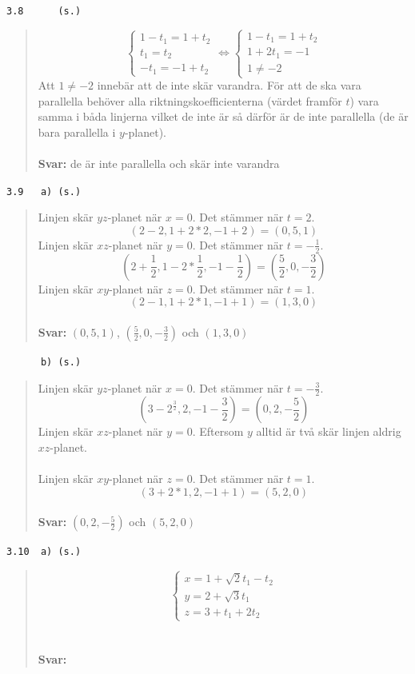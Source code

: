 \documentclass[a4paper]{article}
\newcommand{\tskcol}[1]{\textcolor{tskcol}{#1}}
\begin{document}
\texttt{\tskcol{3.8~~~~~ (s.)}}
\begin{quotation}
	\noindent
	\[\begin{cases}
	1-t_1=1+t_2 \\
	t_1=t_2 \\
	-t_1=-1+t_2
	\end{cases} \Leftrightarrow
	\begin{cases}
	1-t_1=1+t_2 \\
	1+2t_1=-1 \\
	1\neq-2
	\end{cases}\]
	Att $1\neq-2$ innebär att de inte skär varandra. För att de ska vara parallella behöver alla riktningskoefficienterna (värdet framför $t$) vara samma i båda linjerna vilket de inte är så därför är de inte parallella (de är bara parallella i $y$-planet).
	\\ \\
	\textbf{Svar:} de är inte parallella och skär inte varandra
\end{quotation}

\texttt{\tskcol{3.9~~~a) (s.)}}
\begin{quotation}
	\noindent
	Linjen skär $yz$-planet när $x=0$. Det stämmer när $t=2$.
	\[(2-2,1+2*2,-1+2)=(0,5,1)\]
	Linjen skär $xz$-planet när $y=0$. Det stämmer när $t=-\frac{1}{2}$.
	\[(2+\frac{1}{2},1-2*\frac{1}{2},-1-\frac{1}{2})=(\frac{5}{2},0,-\frac{3}{2})\]
	Linjen skär $xy$-planet när $z=0$. Det stämmer när $t=1$.
	\[(2-1,1+2*1,-1+1)=(1,3,0)\]
	\\
	\textbf{Svar:} $(0,5,1)$, $(\frac{5}{2},0,-\frac{3}{2})$ och $(1,3,0)$
\end{quotation}

\texttt{\tskcol{~~~~~~b) (s.)}}
\begin{quotation}
	\noindent
	Linjen skär $yz$-planet när $x=0$. Det stämmer när $t=-\frac{3}{2}$.
	\[(3-2^\frac{3}{2},2,-1-\frac{3}{2})=(0,2,-\frac{5}{2})\]
	Linjen skär $xz$-planet när $y=0$. Eftersom $y$ alltid är två skär  linjen aldrig $xz$-planet.
	\\ \\
	Linjen skär $xy$-planet när $z=0$. Det stämmer när $t=1$.
	\[(3+2*1,2,-1+1)=(5,2,0)\]
	\\
	\textbf{Svar:} $(0,2,-\frac{5}{2})$ och $(5,2,0)$
\end{quotation}

\texttt{\tskcol{3.10~~a) (s.)}}
\begin{quotation}
	\noindent
	\[\begin{cases}
	x=1+\sqrt{2}t_1-t_2 \\
	y=2+\sqrt{3}t_1 \\
	z=3+t_1+2t_2
	\end{cases}\]
	\\ \\
	\textbf{Svar:}
\end{quotation}
\end{document}
